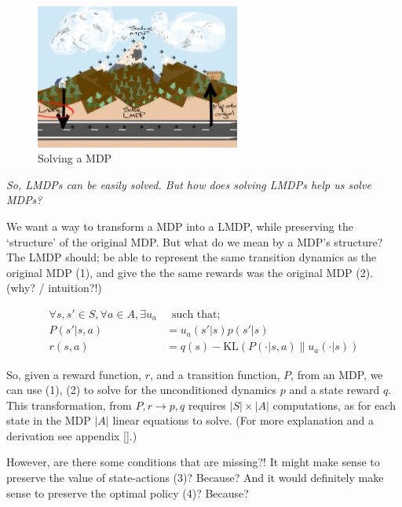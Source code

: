 \begin{figure}[h!]
\centering
\includegraphics[width=0.6\textwidth,height=0.3\textheight]{../../pictures/drawings/abstract-representations-linear.png}
\caption{Solving a MDP}
\end{figure}

\begin{displayquote}
\textit{So, LMDPs can be easily solved. But how does solving LMDPs help us solve MDPs?}
\end{displayquote}

We want a way to transform a MDP into a LMDP, while preserving the
`structure' of the original MDP. But what do we mean by a MDP's structure?
The LMDP should; be able to represent the same transition dynamics as the original MDP (1),
and give the the same rewards was the original MDP (2). \cite{Todorov} {\color{red}(why? / intuition?!)}

\begin{align*}
\forall s, s' \in S, \forall a \in A, \exists u_a& \;\;\text{such that;} \\
P(s' | s, a) &= u_a(s'|s)p(s'|s) \tag{1} \\
r(s, a) &= q(s) - \text{KL}(P(\cdot | s, a) \parallel u_a(\cdot| s) ) \tag{2}
\end{align*}


So, given a reward function, $r$, and a transition function, $P$,
from an MDP, we can use (1), (2) to solve for the unconditioned dynamics $p$ and a state reward $q$.
This transformation, from $P, r \to p, q$ requires $|S| \times |A|$ computations, as for each state in the
MDP \(|A|\) linear equations to solve. (For more explanation and a derivation see appendix [].)

However, are there some conditions that are missing?!
It might make sense to preserve the value of state-actions (3)? {\color{red}Because?}
And it would definitely make sense to preserve the optimal policy (4)? {\color{red}Because?}

